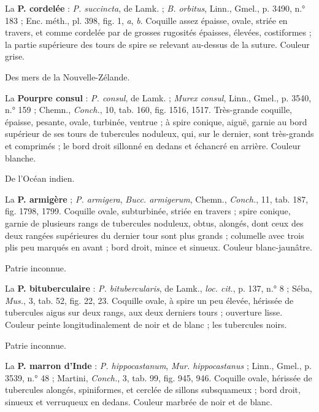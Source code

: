 \documentclass[a4paper, 11pt, oneside, polutonikogreek, french]{article}
\begin{document}
\bigskip

La \textbf{P. cordelée} : \emph{P. succincta}, de Lamk. ; \emph{B. orbitus}, Linn., Gmel., p. 3490, n.° 183 ; Enc. méth., pl. 398, fig. 1, \emph{a}, \emph{b}. Coquille assez épaisse, ovale, striée en travers, et comme cordelée par de grosses rugosités épaisses, élevées, costiformes ; la partie supérieure des tours de spire se relevant au-dessus de la suture. Couleur grise.

Des mers de la Nouvelle-Zélande.

\bigskip

La \textbf{Pourpre consul} : \emph{P. consul}, de Lamk. ; \emph{Murex consul}, Linn., Gmel., p. 3540, n.° 159 ; Chemn., \emph{Conch.}, 10, tab. 160, fig. 1516, 1517. Très-grande coquille, épaisse, pesante, ovale, turbinée, ventrue ; à spire conique, aiguë, garnie au bord supérieur de ses tours de tubercules noduleux, qui, sur le dernier, sont très-grands et comprimés ; le bord droit sillonné en dedans et échancré en arrière. Couleur blanche.

De l'Océan indien.

\bigskip

La \textbf{P. armigère} ; \emph{P. armigera}, \emph{Bucc. armigerum}, Chemn., \emph{Conch.}, 11, tab. 187, fig. 1798, 1799. Coquille ovale, subturbinée, striée en travers ; spire conique, garnie de plusieurs rangs de tubercules noduleux, obtus, alongés, dont ceux des deux rangées supérieures du dernier tour sont plus grands ; columelle avec trois plis peu marqués en avant ; bord droit, mince et sinueux. Couleur blanc-jaunâtre.

Patrie inconnue.

\bigskip

La \textbf{P. bituberculaire} : \emph{P. bitubercularis}, de Lamk., \emph{loc. cit.}, p. 137, n.° 8 ; Séba, \emph{Mus.}, 3, tab. 52, fig. 22, 23. Coquille ovale, à spire un peu élevée, hérissée de tubercules aigus sur deux rangs, aux deux derniers tours ; ouverture lisse. Couleur peinte longitudinalement de noir et de blanc ; les tubercules noirs.

Patrie inconnue.

\bigskip

La \textbf{P. marron d'Inde} : \emph{P. hippocastanum}, \emph{Mur. hippocastanus} ; Linn., Gmel., p. 3539, n.° 48 ; Martini, \emph{Conch.}, 3, tab. 99, fig. 945, 946. Coquille ovale, hérissée de tubercules alongés, spiniformes, et cerclée de sillons subsquameux ; bord droit, sinueux et verruqueux en dedans. Couleur marbrée de noir et de blanc.
\end{document}
